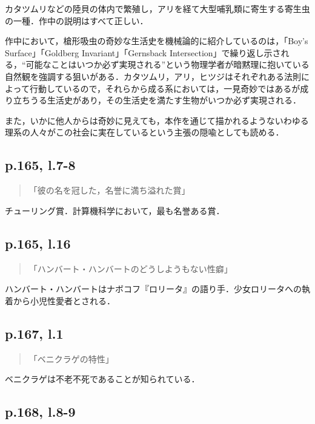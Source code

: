 \documentclass[10pt, a5paper, twoside]{ltjsarticle}
\begin{document}
            カタツムリなどの陸貝の体内で繁殖し，アリを経て大型哺乳類に寄生する寄生虫の一種\cite{waki}．作中の説明はすべて正しい．

            作中において，槍形吸虫の奇妙な生活史を機械論的に紹介しているのは，「Boy's Surface」「Goldberg Invariant」「Gernsback Intersection」で繰り返し示される，“可能なことはいつか必ず実現される”という物理学者が暗黙理に抱いている自然観を強調する狙いがある．カタツムリ，アリ，ヒツジはそれぞれある法則によって行動しているので，それらから成る系においては，一見奇妙ではあるが成り立ちうる生活史があり，その生活史を満たす生物がいつか必ず実現される．

            また，いかに他人からは奇妙に見えても，本作を通じて描かれるようないわゆる理系の人々がこの社会に実在しているという主張の隠喩としても読める．

        \subsection{p.165, l.7-8}

            \begin{quote}
                「彼の名を冠した，名誉に満ち溢れた賞」
            \end{quote}

            チューリング賞．計算機科学において，最も名誉ある賞．

        \subsection{p.165, l.16}

            \begin{quote}
                「ハンバート・ハンバートのどうしようもない性癖」
            \end{quote}

            ハンバート・ハンバートはナボコフ『ロリータ』の語り手．少女ロリータへの執着から小児性愛者とされる．

        \subsection{p.167, l.1}

            \begin{quote}
                「ベニクラゲの特性」
            \end{quote}

            ベニクラゲは不老不死であることが知られている．

        \subsection{p.168, l.8-9}\label{malthus}
\end{document}
